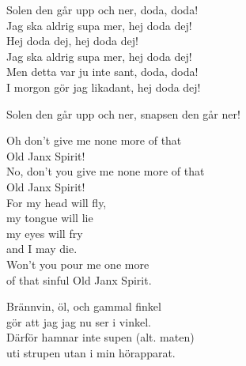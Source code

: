 \documentclass[a6paper, 10pt, twoside]{article}
\begin{document}
\noindent
\begin{center}
\end{center}
\begin{lyrics}
Solen den går upp och ner, doda, doda! \\
Jag ska aldrig supa mer, hej doda dej! \\
Hej doda dej, hej doda dej! \\
Jag ska aldrig supa mer, hej doda dej! 
\vspace{5pt} \\
Men detta var ju inte sant, doda, doda! \\
I morgon gör jag likadant, hej doda dej! 
\end{lyrics}
\vspace{10pt}
\begin{center}
\end{center}
\begin{lyrics}
Solen den går upp och ner, snapsen den går ner!
\end{lyrics}
\vspace{25pt}
\begin{center}
\end{center}
\begin{lyrics}
Oh don't give me none more of that \\
Old Janx Spirit! \\
No, don't you give me none more of that \\
Old Janx Spirit! \\
For my head will fly, \\
my tongue will lie \\
my eyes will fry \\
and I may die. \\
Won't you pour me one more \\
of that sinful Old Janx Spirit. 
\end{lyrics}

\noindent
\begin{center}
\end{center}
\begin{lyrics}
Brännvin, öl, och gammal finkel \\
gör att jag jag nu ser i vinkel. \\
Därför hamnar inte supen (alt. maten) \\
uti strupen utan i min hörapparat.\\
\end{lyrics}
\end{document}
